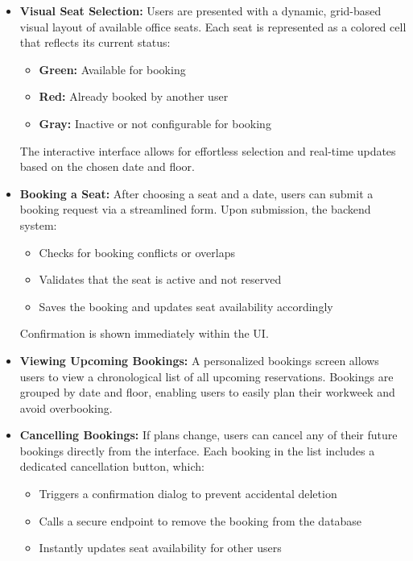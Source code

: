 \documentclass[12pt,a4paper]{report} %
\begin{document}
\begin{itemize}
    \item \textbf{Visual Seat Selection:}  
    Users are presented with a dynamic, grid-based visual layout of available office seats. Each seat is represented as a colored cell that reflects its current status:
    \begin{itemize}
        \item \textbf{Green:} Available for booking
        \item \textbf{Red:} Already booked by another user
        \item \textbf{Gray:} Inactive or not configurable for booking
    \end{itemize}
    The interactive interface allows for effortless selection and real-time updates based on the chosen date and floor.

    \item \textbf{Booking a Seat:}  
    After choosing a seat and a date, users can submit a booking request via a streamlined form. Upon submission, the backend system:
    \begin{itemize}
        \item Checks for booking conflicts or overlaps
        \item Validates that the seat is active and not reserved
        \item Saves the booking and updates seat availability accordingly
    \end{itemize}
    Confirmation is shown immediately within the UI.

    \item \textbf{Viewing Upcoming Bookings:}  
    A personalized bookings screen allows users to view a chronological list of all upcoming reservations. Bookings are grouped by date and floor, enabling users to easily plan their workweek and avoid overbooking.

    \item \textbf{Cancelling Bookings:}  
    If plans change, users can cancel any of their future bookings directly from the interface. Each booking in the list includes a dedicated cancellation button, which:
    \begin{itemize}
        \item Triggers a confirmation dialog to prevent accidental deletion
        \item Calls a secure endpoint to remove the booking from the database
        \item Instantly updates seat availability for other users
    \end{itemize}
\end{itemize}
\end{document}
